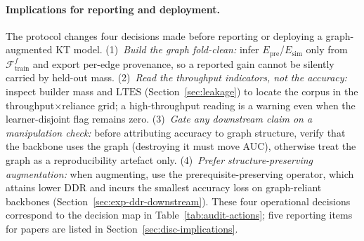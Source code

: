\documentclass[preprint,10pt,doubleblind]{elsarticle}
\newcommand{\Epre}{\ensuremath{E_{\text{pre}}}}
\newcommand{\Esim}{\ensuremath{E_{\text{sim}}}}
\newcommand{\DDR}{\textsc{DDR}}
\begin{document}
\paragraph{Implications for reporting and deployment.}
The protocol changes four decisions made before reporting or deploying a
graph-augmented KT model. (1)~\emph{Build the graph fold-clean:}
infer $\Epre$/$\Esim$ only from $\mathcal{F}^f_{\text{train}}$ and export
per-edge provenance, so a reported gain cannot be silently carried by held-out
mass. (2)~\emph{Read the throughput indicators, not the accuracy:} inspect
builder mass and $\mathrm{LTES}$ (Section~\ref{sec:leakage}) to locate
the corpus in the throughput$\times$reliance grid; a high-throughput reading is
a warning even when the learner-disjoint flag remains zero. (3)~\emph{Gate any
downstream claim on a manipulation check:} before attributing accuracy to graph
structure, verify that the backbone uses the graph (destroying it must move
AUC), otherwise treat the graph as a reproducibility artefact only. (4)~\emph{Prefer
structure-preserving augmentation:} when augmenting, use the
prerequisite-preserving operator, which attains lower \DDR{} and incurs the
smallest accuracy loss on graph-reliant backbones (Section~\ref{sec:exp-ddr-downstream}). These
four operational decisions correspond to the decision map in
Table~\ref{tab:audit-actions}; five reporting items for papers are listed in
Section~\ref{sec:disc-implications}.
\end{document}
